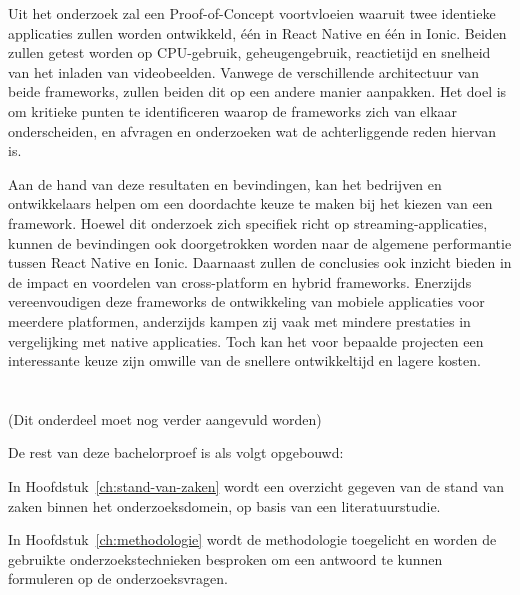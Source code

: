 Uit het onderzoek zal een Proof-of-Concept voortvloeien waaruit twee identieke applicaties zullen worden ontwikkeld, één in React Native en één in Ionic. Beiden zullen getest worden op CPU-gebruik, geheugengebruik, reactietijd en snelheid van het inladen van videobeelden. Vanwege de verschillende architectuur van beide frameworks, zullen beiden dit op een andere manier aanpakken. Het doel is om kritieke punten te identificeren waarop de frameworks zich van elkaar onderscheiden, en afvragen en onderzoeken wat de achterliggende reden hiervan is.

Aan de hand van deze resultaten en bevindingen, kan het bedrijven en ontwikkelaars helpen om een doordachte keuze te maken bij het kiezen van een framework. Hoewel dit onderzoek zich specifiek richt op streaming-applicaties, kunnen de bevindingen ook doorgetrokken worden naar de algemene performantie tussen React Native en Ionic. Daarnaast zullen de conclusies ook inzicht bieden in de impact en voordelen van cross-platform en hybrid frameworks. Enerzijds vereenvoudigen deze frameworks de ontwikkeling van mobiele applicaties voor meerdere platformen, anderzijds kampen zij vaak met mindere prestaties in vergelijking met native applicaties. Toch kan het voor bepaalde projecten een interessante keuze zijn omwille van de snellere ontwikkeltijd en lagere kosten.

\section{}%
\label{sec:opzet-bachelorproef}


(Dit onderdeel moet nog verder aangevuld worden)

De rest van deze bachelorproef is als volgt opgebouwd: 

In Hoofdstuk~\ref{ch:stand-van-zaken} wordt een overzicht gegeven van de stand van zaken binnen het onderzoeksdomein, op basis van een literatuurstudie.

In Hoofdstuk~\ref{ch:methodologie} wordt de methodologie toegelicht en worden de gebruikte onderzoekstechnieken besproken om een antwoord te kunnen formuleren op de onderzoeksvragen.


